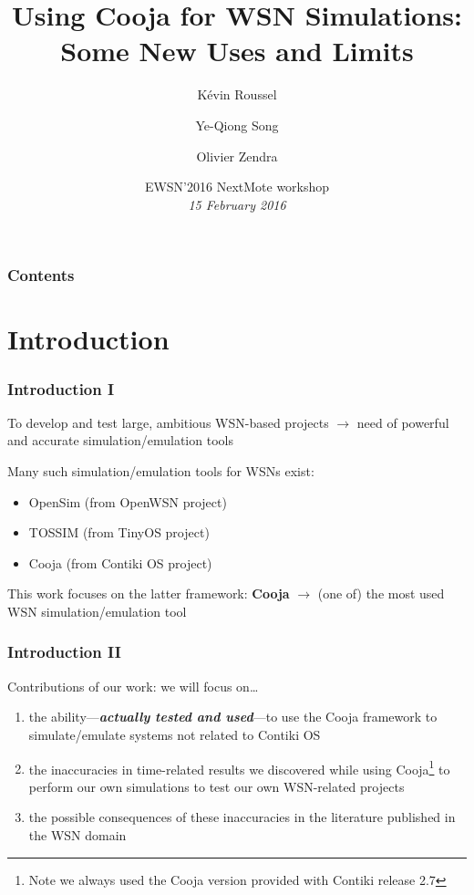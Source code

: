 \documentclass[10pt,c]{beamer}
\title{Using Cooja for WSN Simulations: Some New Uses and Limits}
\author{Kévin Roussel \and Ye-Qiong Song \and Olivier Zendra}
\institute{INRIA Nancy Grand-Est~---
           LORIA UMR~7503~--- Université de Lorraine}
\date{EWSN'2016 NextMote workshop\\
      \textit{15 February 2016}}
\renewcommand{\emph}[1]{\textbf{\textit{#1}}}
\newcommand{\nom}[1]{\textbf{#1}}
\begin{document}
\begin{frame}
\titlepage
\end{frame}


\begin{frame}
\frametitle{Contents}
\tableofcontents
\end{frame}


\section{Introduction}

\begin{frame}
\frametitle{Introduction I}
\begin{block}{To develop and test large, ambitious WSN-based projects}
$\rightarrow$ need of powerful and accurate simulation/emulation tools
\end{block}
\begin{block}{Many such simulation/emulation tools for WSNs exist:}
\begin{itemize}
\item OpenSim (from OpenWSN project)
\item TOSSIM (from TinyOS project)
\item Cooja (from Contiki OS project)
\end{itemize}
\end{block}
\begin{exampleblock}{This work focuses on the latter framework: \nom{Cooja}}
$\rightarrow$ (one of) the most used WSN simulation/emulation tool
\end{exampleblock}
\end{frame}

\begin{frame}
\frametitle{Introduction II}
\begin{block}{Contributions of our work: we will focus on\ldots}
\begin{enumerate}
\item the ability---\emph{actually tested and used}---to use the Cooja
framework to simulate/emulate systems not related to Contiki OS
\item the inaccuracies in time-related results we discovered while using
Cooja\footnote{Note we always used the Cooja version provided with
Contiki release 2.7} to perform our own simulations to test our own
WSN-related projects
\item the possible consequences of these inaccuracies in the literature
published in the WSN domain
\end{enumerate}
\end{block}
\end{frame}
\end{document}
